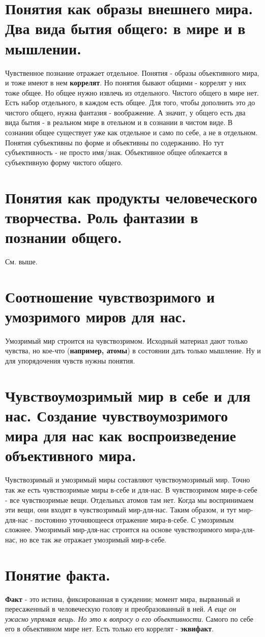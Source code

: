 \section{ Понятия как образы внешнего мира. Два вида бытия общего: в мире и в мышлении.}
Чувственное познание отражает отдельное. Понятия - образы объективного мира, и тоже имеют в нем \textbf{коррелят}. Но понятия бывают общими - коррелят у них тоже общее. Но общее нужно извлечь из отдельного. Чистого общего в мире нет. Есть набор отдельного, в каждом есть общее. Для того, чтобы дополнить это до чистого общего, нужна фантазия - воображение. А значит, у общего есть два вида бытия  - в реальном мире в отельном и в сознании в чистом виде. В сознании общее существует уже как отдельное и само по себе, а не в отдельном. Понятия субъективны по форме и объективны по содержанию. Но тут субъективность - не просто имя/знак. Объективное общее облекается в субъективную форму чистого общего. 

\section{ Понятия как продукты человеческого творчества. Роль фантазии в познании общего.}
См. выше.

\section{ Соотношение чувствозримого и умозримого миров для нас.}
Умозримый мир строится на чувствозримом. Исходный материал дают только чувства, но кое-что (\textbf{например, атомы}) в состоянии дать только мышление. Ну и для упорядочения чувств нужны понятия.

\section{ Чувствоумозримый мир в себе и для нас. Создание чувствоумозримого мира для нас как воспроизведение объективного мира.}
Чувствозримый и умозримый миры составляют чувствоумозримый мир. Точно так же есть чувствозримые миры в-себе и для-нас. В чувствозримом мире-в-себе - все чувствозримые вещи. Отдельных атомов там нет. Когда мы воспринимаем эти вещи, они входят в чувствозримый мир-для-нас. Таким образом, и тут мир-для-нас - постоянно уточняющееся отражение мира-в-себе. С умозримым сложнее. Умозримый мир-для-нас строится на основе чувствозримого мира-для-нас, но все так же отражает умозримый мир-в-себе.

\section{ Понятие факта.}
\textbf{Факт} - это истина, фиксированная в суждении; момент мира, вырванный и пересаженный в человеческую голову и преобразованный в ней. \textit{А еще он ужасно упрямая вещь. Но это к вопросу о его объективности}. Самого по себе его в объективном мире нет. Есть только его коррелят - \textbf{эквифакт}.

